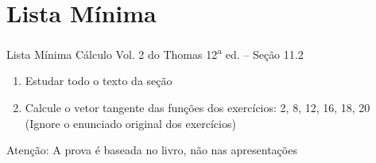 \documentclass[fleqn,utf8,aspectratio=169,12pt,ignorenonframetext]{beamer}
\begin{document}


\section{Lista Mínima}

\begin{frame}{Lista Mínima}
  Cálculo Vol. 2 do Thomas 12\textsuperscript{a} ed. -- Seção 11.2
  \begin{enumerate}
    \item Estudar todo o texto da seção
    \item Calcule o vetor tangente das funções dos exercícios: 2, 8, 12, 16, 18, 20\\
          (Ignore o enunciado original dos exercícios)
  \end{enumerate}

  \vfill
  Atenção: A prova é baseada no livro, não nas apresentações
\end{frame}

\end{document}
